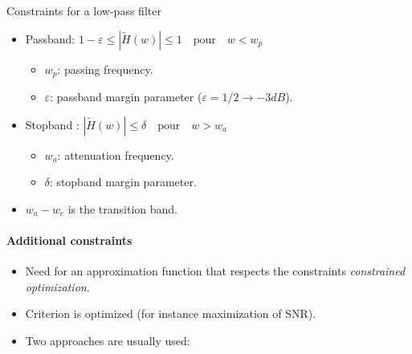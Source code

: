      \begin{block}{Constraints for a low-pass filter}
       \begin{itemize}
       \item Passband: 
   $ 1-\varepsilon \leq |\tilde H(w)| \leq 1 \quad \text{pour} \quad w<w_p$
   \begin{itemize}
   \item $w_p$: passing frequency.
   \item $\varepsilon$: passband margin parameter ($\varepsilon=1/2\rightarrow-3dB$).
   \end{itemize}
   \item Stopband : $ |\tilde H(w)| \leq \delta \quad \text{pour} \quad w>w_a$
     \begin{itemize}
   \item $w_a$: attenuation frequency.
   \item $\delta$: stopband margin parameter.
     \end{itemize}
   \item $w_a-w_c$ is the transition band.
       \end{itemize}
     \end{block}

     \paragraph{Additional constraints}
     
     \begin{itemize}
      \item Need for an approximation function that respects the constraints \emph{constrained optimization}.
      \item Criterion is optimized (for instance maximization of SNR).
      \item Two approaches are usually used:
      \end{itemize}
    
